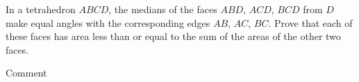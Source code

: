 In a tetrahedron $ABCD$, the medians of the faces $ABD$, $ACD$, $BCD$ from $D$ make equal angles with the corresponding edges $AB$, $AC$, $BC$. Prove that each of these faces has area less than or equal to the sum of the areas of the other two faces.

Comment